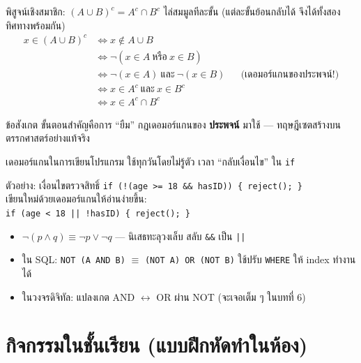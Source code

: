 \begin{frame}{พิสูจน์เชิงสมาชิก: $(A \cup B)^c = A^c \cap B^c$}
  ไล่สมมูลทีละขั้น (แต่ละขั้นย้อนกลับได้ จึงได้ทั้งสองทิศทางพร้อมกัน)
  \begin{align*}
    x \in (A \cup B)^c
      &\Leftrightarrow x \notin A \cup B \\
      &\Leftrightarrow \neg(x \in A \ \text{หรือ}\ x \in B) \\
      &\Leftrightarrow \neg(x \in A) \ \text{และ}\ \neg(x \in B) && \text{(เดอมอร์แกนของประพจน์!)} \\
      &\Leftrightarrow x \in A^c \ \text{และ}\ x \in B^c \\
      &\Leftrightarrow x \in A^c \cap B^c
  \end{align*}
  \vspace{0.1em}
  \begin{exampleblock}{ข้อสังเกต}
    ขั้นตอนสำคัญคือการ ``ยืม'' กฎเดอมอร์แกนของ \textbf{ประพจน์} มาใช้ ---
    ทฤษฎีเซตสร้างบนตรรกศาสตร์อย่างแท้จริง
  \end{exampleblock}
\end{frame}

\begin{frame}{เดอมอร์แกนในการเขียนโปรแกรม}
  ใช้ทุกวันโดยไม่รู้ตัว เวลา ``กลับเงื่อนไข'' ใน \texttt{if}
  \begin{block}{ตัวอย่าง: เงื่อนไขตรวจสิทธิ์}
    \texttt{if (!(age >= 18 \&\& hasID)) \{ reject(); \}} \\[0.3em]
    เขียนใหม่ด้วยเดอมอร์แกนให้อ่านง่ายขึ้น: \\[0.3em]
    \texttt{if (age < 18 || !hasID) \{ reject(); \}}
  \end{block}
  \vspace{0.3em}
  \begin{itemize}
    \item $\neg(p \land q) \equiv \neg p \lor \neg q$ --- นิเสธทะลุวงเล็บ สลับ \texttt{\&\&} เป็น \texttt{||}
    \item ใน SQL: \texttt{NOT (A AND B)} $\equiv$ \texttt{(NOT A) OR (NOT B)} ใช้ปรับ \texttt{WHERE} ให้ index ทำงานได้
    \item ในวงจรดิจิทัล: แปลงเกต AND $\leftrightarrow$ OR ผ่าน NOT (จะเจอเต็ม ๆ ในบทที่ 6)
  \end{itemize}
\end{frame}


\section{กิจกรรมในชั้นเรียน (แบบฝึกหัดทำในห้อง)}

